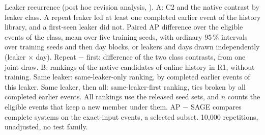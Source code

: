 \begin{table}[h]
\footnotesize
\centering
\caption{Leaker recurrence (post hoc revision analysis, ). A: C2 and the native contrast by leaker class. A repeat leaker led at least one completed earlier event of the history library, and a first-seen leaker did not. Paired AP difference over the eligible events of the class, mean over five training seeds, with ordinary 95\,\% intervals over training seeds and then day blocks, or leakers and days drawn independently (leaker $\times$ day). Repeat $-$ first: difference of the two class contrasts, from one joint draw. B: rankings of the native candidates of online history in R1, without training. Same leaker: same-leaker-only ranking, by completed earlier events of this leaker. Same leaker, then all: same-leaker-first ranking, ties broken by all completed earlier events. All rankings use the released seed sets, and $n$ counts the eligible events that keep a new member under them. AP $-$ SAGE compares complete systems on the exact-input events, a selected subset. 10,000 repetitions, unadjusted, no test family.}
\label{tab:leaker-split}
\setlength{\tabcolsep}{3pt}

\end{table}

